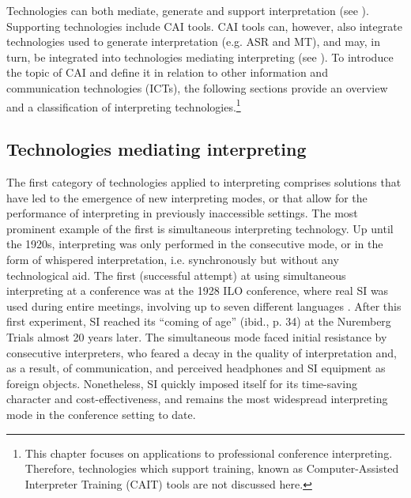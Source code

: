 \begin{sloppypar}
Technologies can both mediate, generate and support interpretation (see \citealt{braun_technology_2020}). Supporting technologies include CAI tools. CAI tools can, however, also integrate technologies used to generate interpretation (e.g. ASR and MT), and may, in turn, be integrated into technologies mediating interpreting (see \citealt[65]{will2020computer}). To introduce the topic of CAI and define it in relation to other information and communication technologies (ICTs), the following sections provide an overview and a classification of interpreting technologies.\footnote{This chapter focuses on applications to professional conference interpreting. Therefore, technologies which support training, known as Computer-Assisted Interpreter Training (CAIT) tools are not discussed here.}
\end{sloppypar}

\subsection{Technologies mediating interpreting} \label{tech_mediation}
The first category of technologies applied to interpreting comprises solutions that have led to the emergence of new interpreting modes, or that allow for the performance of interpreting in previously inaccessible settings. The most prominent example of the first is simultaneous interpreting technology. Up until the 1920s, interpreting was only performed in the consecutive mode, or in the form of whispered interpretation, i.e. synchronously but without any technological aid. The first (successful attempt) at using simultaneous interpreting at a conference was at the 1928 ILO conference, where real SI was used during entire meetings, involving up to seven different languages \citep[33]{baigorri-jalon_conference_1999}. After this first experiment, SI reached its ``coming of age'' (ibid., p. 34) at the Nuremberg Trials almost 20 years later. The simultaneous mode faced initial resistance by consecutive interpreters, who feared a decay in the quality of interpretation and, as a result, of communication, and perceived headphones and SI equipment as foreign objects. Nonetheless, SI quickly imposed itself for its time-saving character and cost-effectiveness, and remains the most widespread interpreting mode in the conference setting to date.

